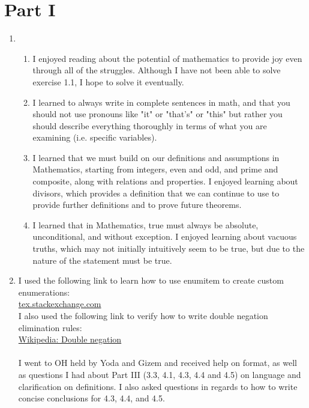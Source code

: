 \documentclass{article}
\begin{document}
\section*{Part I}

\begin{enumerate}[1.]
    \item
    \begin{enumerate}[label=(Section \arabic*), leftmargin=*]
        \item I enjoyed reading about the potential of mathematics to provide joy even through all of the struggles. Although I have not been able to solve exercise 1.1, I hope to solve it eventually.
        \item I learned to always write in complete sentences in math, and that you should not use pronouns like "it" or "that's" or "this" but rather you should describe everything thoroughly in terms of what you are examining (i.e. specific variables).
        \item I learned that we must build on our definitions and assumptions in Mathematics, starting from integers, even and odd, and prime and composite, along with relations and properties. I enjoyed learning about divisors, which provides a definition that we can continue to use to provide further definitions and to prove future theorems.
        \item I learned that in Mathematics, true must always be absolute, unconditional, and without exception. I enjoyed learning about vacuous truths, which may not initially intuitively seem to be true, but due to the nature of the statement must be true.
    \end{enumerate}
    \item I used the following link to learn how to use enumitem to create custom enumerations:\\
          \href {https://tex.stackexchange.com/questions/600622/custom-enumerate-environment}{tex.stackexchange.com}\\
          I also used the following link to verify how to write double negation elimination rules:\\
          \href {https://en.wikipedia.org/wiki/Double_negation}{Wikipedia: Double negation} \\
          \\
          I went to OH held by Yoda and Gizem and received help on format, as well as questions I had about Part III (3.3, 4.1, 4.3, 4.4 and 4.5) on language and clarification on definitions. I also asked questions in regards to how to write concise conclusions for 4.3, 4.4, and 4.5.
\end{enumerate}
\end{document}
